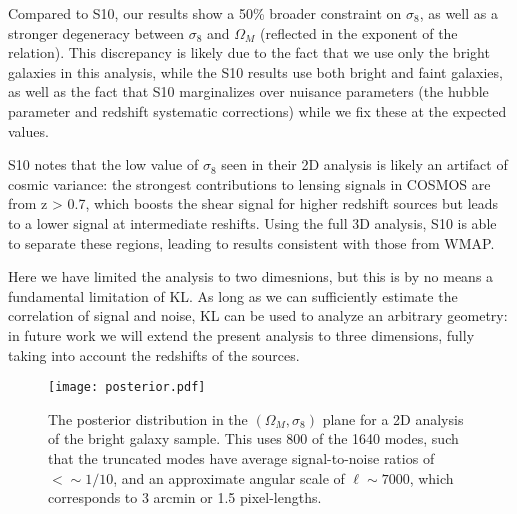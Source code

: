 Compared to S10, our results show a 50\% broader constraint on $\sigma_8$,
as well as a stronger degeneracy between $\sigma_8$ and $\Omega_M$ 
(reflected in the exponent of the relation).  This discrepancy is likely
due to the fact that we use only the bright galaxies in this analysis,
while the S10 results use both bright and faint galaxies, as well as the
fact that S10 marginalizes over nuisance parameters (the hubble parameter
and redshift systematic corrections) while we fix these at the  expected
values.

S10 notes that the low value of $\sigma_8$ seen in their 2D analysis is likely
an artifact of cosmic variance: the strongest contributions to lensing
signals in COSMOS are from z > 0.7, which boosts the shear signal for higher
redshift sources but leads to a lower signal at intermediate reshifts.
Using the full 3D analysis, S10 is able to separate these regions, leading
to results consistent with those from WMAP.

Here we have limited the analysis to two dimesnions, but this is by no means a
fundamental limitation of KL.  As long as we can sufficiently estimate the
correlation of signal and noise, KL can be used to analyze an arbitrary
geometry: in future work we will extend the present analysis to three
dimensions, fully taking into account the redshifts of the sources.

\begin{figure*}
 \centering
 \texttt{[image: posterior.pdf]}
 \caption{The posterior distribution in the $(\Omega_M, \sigma_8)$ plane
   for a 2D analysis of the bright galaxy sample.  This uses 800 of the
   1640 modes, such that the truncated modes have average signal-to-noise
   ratios of $<\sim 1/10$, and an approximate angular scale of
   $\ell \sim 7000$, which corresponds to 3 arcmin or 1.5 pixel-lengths.}
 \label{fig:posterior}
\end{figure*}

